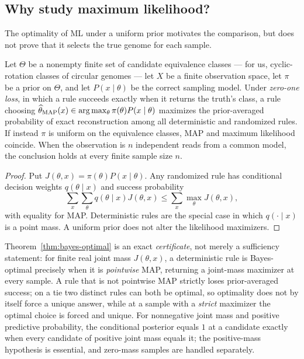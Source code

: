 \subsection{Why study maximum likelihood?}
\label{sec:bayes-rationale}

The optimality of ML under a uniform prior motivates the comparison, but
does not prove that it selects the true genome for each sample.

\begin{theorem}
\label{thm:bayes-optimal}
Let $\Theta$ be a nonempty finite set of candidate equivalence classes ---
for us, cyclic-rotation classes of circular genomes --- let $X$ be a finite
observation space, let $\pi$ be a prior on $\Theta$, and let $P(x\mid\theta)$
be the correct sampling model. Under \emph{zero-one loss}, in which a rule
succeeds exactly when it returns the truth's class, a rule choosing
$\widehat\theta_{\rm MAP}(x)\in\arg\max_\theta\pi(\theta)P(x\mid\theta)$
maximizes the prior-averaged probability of exact reconstruction among
all deterministic and randomized rules. If instead $\pi$ is uniform on the
equivalence classes, MAP and maximum likelihood coincide. When the observation
is $n$ independent reads from a common model, the conclusion holds at every
finite sample size $n$.
\end{theorem}

\begin{proof}
Put $J(\theta,x)=\pi(\theta)P(x\mid\theta)$. Any randomized rule has
conditional decision weights $q(\theta\mid x)$ and success probability
\[
 \sum_x\sum_\theta q(\theta\mid x)J(\theta,x)
 \le \sum_x\max_\theta J(\theta,x),
\]
with equality for MAP. Deterministic rules are the special case in which
$q(\cdot\mid x)$ is a point mass. A uniform prior does not alter the
likelihood maximizers.
\end{proof}



\begin{remark}
\label{rem:bayes-certificate}
Theorem~\ref{thm:bayes-optimal} is an exact \emph{certificate}, not merely a
sufficiency statement: for finite real joint mass $J(\theta,x)$, a deterministic
rule is Bayes-optimal precisely when it is \emph{pointwise} MAP, returning a
joint-mass maximizer at every sample. A rule that is not pointwise MAP strictly
loses prior-averaged success; on a tie two distinct rules can both be optimal, so
optimality does not by itself force a unique answer, while at a sample with a
\emph{strict} maximizer the optimal choice is forced and unique. For nonnegative
joint mass and positive predictive probability, the conditional posterior
equals $1$ at a candidate exactly when every candidate of positive joint mass
equals it; the positive-mass hypothesis is essential, and zero-mass samples are
handled separately.
\end{remark}


